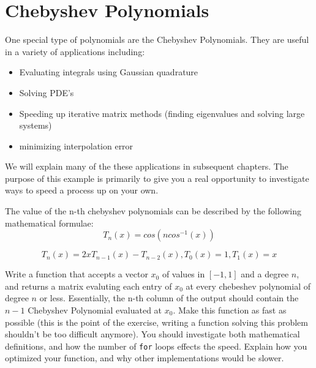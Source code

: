 \section*{Chebyshev Polynomials}

One special type of polynomials are the Chebyshev Polynomials. They are useful in a variety of applications including:
\begin{itemize}
\item Evaluating integrals using Gaussian quadrature
\item Solving PDE's
\item Speeding up iterative matrix methods (finding eigenvalues and solving large systems)
\item minimizing interpolation error
\end{itemize}

We will explain many of the these applications in subsequent chapters. The purpose of this example is primarily to give you a real opportunity to investigate ways to speed a process up on your own.

The value of the n-th chebyshev polynomials can be described by the following mathematical formulae\footnotemark :
\[
T_n(x) = cos(n cos^{-1}(x))
\]

\[
T_n(x) = 2xT_{n-1}(x) - T_{n-2}(x), T_0(x) = 1, T_1(x) = x
\]


\begin{problem}
Write a function that accepts a vector $x_0$ of values in $[-1,1]$ and a degree $n$, and returns a matrix evaluting each entry of $x_0$ at every chebeshev polynomial of degree $n$ or less. Essentially, the n-th column of the output should contain the $n-1$ Chebyshev Polynomial evaluated at $x_0$. Make this function as fast as possible (this is the point of the exercise, writing a function solving this problem shouldn't be too difficult anymore). You should investigate both mathematical definitions, and how the number of {\tt for} loops effects the speed. Explain how you optimized your function, and why other implementations would be slower.
\end{problem}
